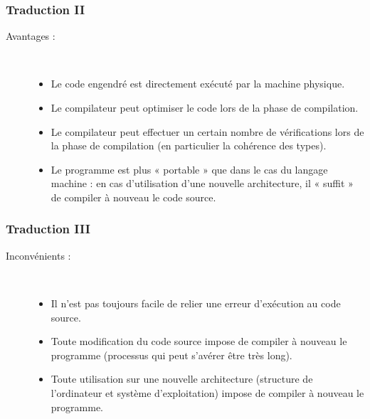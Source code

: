 \documentclass[utf8,10pt]{beamer}
\begin{document}
\begin{frame}
    \frametitle{Traduction II}
    \begin{description}
        \item[Avantages :]\hspace{1cm}\\
        \begin{itemize}
            \item Le code engendré est directement exécuté par la machine physique.
            \item Le compilateur peut optimiser le code lors de la phase de compilation.
            \item Le compilateur peut effectuer un certain nombre de vérifications lors de la phase de 
            compilation (en particulier la cohérence des \alert{types}).
            \item Le programme est plus « portable » que dans le cas du langage machine : en cas 
            d’utilisation d’une nouvelle architecture, il « suffit » de compiler à nouveau le code source.
        \end{itemize}
    \end{description}

\end{frame}

\begin{frame}
    \frametitle{Traduction III}
    \begin{description}
        \item[Inconvénients :]\hspace{1cm}\\
        \begin{itemize}
            \item Il n’est pas toujours facile de relier une erreur d’exécution au code source.
            \item Toute modification du code source impose de compiler à nouveau le programme (processus 
            qui peut s'avérer être très long).
            \item Toute utilisation sur une nouvelle architecture (structure de l'ordinateur et système
            d'exploitation) impose de compiler à nouveau le programme.
        \end{itemize}
    \end{description}

\end{frame}
\end{document}

